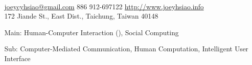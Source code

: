 \documentclass[10pt, a4paper]{article} %
\begin{document}
 

\noindent
\\
\noindent\href{mailto:joeycyhsiao@gmail.com}{joeycyhsiao@gmail.com}\bull %
\textsmaller{+}886 912-697122\bull 
\href{http://www.joeyhsiao.info}{http://www.joeyhsiao.info}\\
172 Jiande St., East Dist., Taichung, Taiwan 40148\\
\spacedhrule{0.5em}{-1em} %






Main: Human-Computer Interaction (), Social Computing 

Sub: Computer-Mediated Communication, Human Computation, Intelligent User Interface

\spacedhrule{1.5em}{-1em} %

\end{document}
